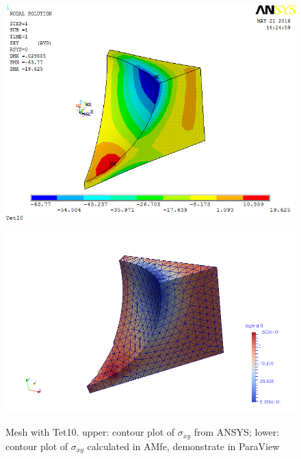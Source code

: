 \begin{figure}[htbp]
	\begin{center}
		\includegraphics[width=13cm,clip]{Tet10_Sxy.png} 		
		\includegraphics[width=13cm,clip]{Tet10_Sxy_P.png} 		
		\caption{Mesh with Tet10. upper: contour plot of $\sigma_{xy}$ from ANSYS; lower: contour plot of $\sigma_{xy}$ calculated in AMfe, demonstrate in ParaView} \label{fig: Tet10_Sxy}
	\end{center}
\end{figure}

